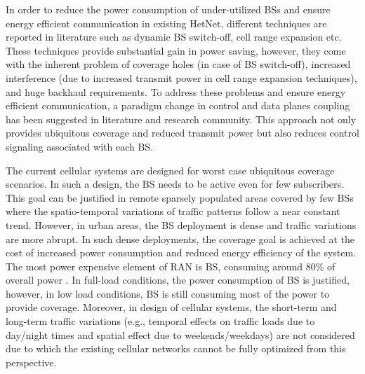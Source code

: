\documentclass[article,10pt,twocolumn]{IEEEtran}
\begin{document}
In order to reduce the power consumption of under-utilized BSs and ensure energy efficient communication in existing HetNet, different techniques are reported in literature such as dynamic BS switch-off, cell range expansion etc. These techniques provide substantial gain in power saving, however, they come with the inherent problem of coverage holes (in case of BS switch-off), increased interference (due to increased transmit power in cell range expansion techniques), and huge backhaul requirements. To address these problems and ensure energy efficient communication, a paradigm change in control and data planes coupling has been suggested in literature and research community. This approach not only provides ubiquitous coverage and reduced transmit power but also reduces control signaling associated with each BS.

The current cellular systems are designed for worst case ubiquitous coverage scenarios. In such a design, the BS needs to be active even for few subscribers. This goal can be justified in remote sparsely populated areas covered by few BSs where the spatio-temporal variations of traffic patterns follow a near constant trend. However, in urban areas, the BS deployment is dense and traffic variations are more abrupt. In such dense deployments, the coverage goal is achieved at the cost of increased power consumption and reduced energy efficiency of the system. The most power expensive element of RAN is BS, consuming around 80\% of overall power \citep{6152217,4448824}. In full-load conditions, the power consumption of BS is justified, however, in low load conditions, BS is still consuming most of the power to provide coverage. Moreover, in design of cellular systems, the short-term and long-term traffic variations (e.g., temporal effects on traffic loads due to day/night times and spatial effect due to weekends/weekdays) are not considered due to which the existing cellular networks cannot be fully optimized from this perspective.
\end{document}

